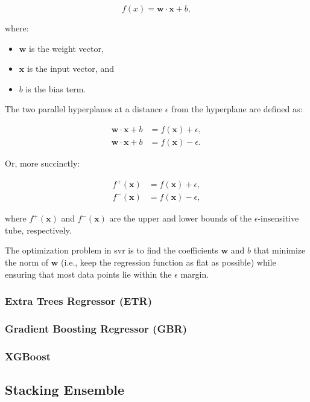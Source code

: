 $$
f(x) = \mathbf{w} \cdot \mathbf{x} + b,
$$

where:

\begin{itemize}
	\item $\mathbf{w}$ is the weight vector,
	\item $\mathbf{x}$ is the input vector, and
	\item $b$ is the bias term.
\end{itemize}

The two parallel hyperplanes at a distance $\epsilon$ from the hyperplane are defined as:

$$
\begin{aligned}
    \mathbf{w} \cdot \mathbf{x} + b &= f(\mathbf{x}) + \epsilon, \\
    \mathbf{w} \cdot \mathbf{x} + b &= f(\mathbf{x}) - \epsilon.
\end{aligned}
$$

Or, more succinctly:

$$
\begin{aligned}
    f^+(\mathbf{x}) &= f(\mathbf{x}) + \epsilon, \\
    f^-(\mathbf{x}) &= f(\mathbf{x}) - \epsilon,
\end{aligned}
$$

where $f^+(\mathbf{x})$ and $f^-(\mathbf{x})$ are the upper and lower bounds of the $\epsilon$-insensitive tube, respectively.

The optimization problem in \gls{svr} is to find the coefficients $\mathbf{w}$ and $b$ that minimize the norm of $\mathbf{w}$ (i.e., keep the regression function as flat as possible) while ensuring that most data points lie within the $\epsilon$ margin.

\subsubsection{Extra Trees Regressor (ETR)}

\subsubsection{Gradient Boosting Regressor (GBR)}

\subsubsection{XGBoost}

\subsection{Stacking Ensemble}

